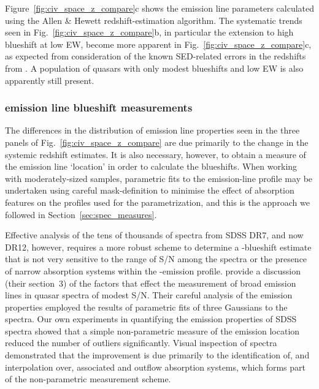 Figure~\ref{fig:civ_space_z_compare}c shows the  emission line parameters calculated using the Allen \& Hewett redshift-estimation algorithm.  
The systematic trends seen in Fig.~\ref{fig:civ_space_z_compare}b, in particular the extension to high blueshift at low  EW, become more apparent in Fig.~\ref{fig:civ_space_z_compare}c, as expected from consideration of the known SED-related errors in the redshifts from \citet{hewett10}.
A population of quasars with only modest blueshifts and low EW is also apparently still present. 

\subsubsection{ emission line blueshift measurements}
\label{sec:civmeasure}

The differences in the distribution of  emission line properties seen in the three panels of Fig.~\ref{fig:civ_space_z_compare} are due primarily to the change in the systemic redshift estimates. 
It is also necessary, however, to obtain a measure of the  emission line `location' in order to calculate the blueshifts. 
When working with moderately-sized samples, parametric fits to the emission-line profile may be undertaken using careful mask-definition to minimise the effect of absorption features on the profiles used for the parametrization, and this is the approach we followed in Section~\ref{sec:spec_measures}.

Effective analysis of the tens of thousands of spectra from SDSS DR7, and now DR12, however, requires a more robust scheme to determine a -blueshift estimate that is not very sensitive to the range of S/N among the spectra or the presence of narrow absorption systems within the -emission profile. 
\citet{shen11} provide a discussion (their section~3) of the factors that effect the measurement of broad emission lines in quasar spectra of modest S/N. 
Their careful analysis of the  emission properties employed the results of parametric fits of three Gaussians to the spectra. 
Our own experiments in quantifying the  emission properties of SDSS spectra showed that a simple non-parametric measure of the  emission location reduced the number of outliers significantly. 
Visual inspection of spectra demonstrated that the improvement is due primarily to the identification of, and interpolation over, associated and outflow absorption systems, which forms part of the non-parametric measurement scheme. 

